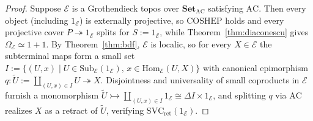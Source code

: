 \documentclass[10pt,twoside,openright]{book}
\theoremstyle{crmplain}
\theoremstyle{crmdef}
\theoremstyle{crmremark}
\begin{document}
\begin{proof}
Suppose $\mathcal{E}$ is a Grothendieck topos over $\mathbf{Set}_{\mathrm{AC}}$ satisfying $\mathrm{AC}$. Then every object (including $1_{\mathcal{E}}$) is externally projective, so $\mathrm{COSHEP}$ holds and every projective cover $P \twoheadrightarrow 1_{\mathcal{E}}$ splits for $S := 1_{\mathcal{E}}$, while Theorem~\ref{thm:diaconescu} gives $\Omega_{\mathcal{E}} \simeq 1+1$. By Theorem~\ref{thm:bdf}, $\mathcal{E}$ is localic, so for every $X \in \mathcal{E}$ the subterminal maps form a small set $I := \{(U, x) \mid U \in \mathrm{Sub}_{\mathcal{E}}(1_{\mathcal{E}}),\, x \in \mathrm{Hom}_{\mathcal{E}}(U, X)\}$ with canonical epimorphism $q : \widetilde{U} := \coprod_{(U, x) \in I} U \twoheadrightarrow X$. Disjointness and universality of small coproducts in $\mathcal{E}$ furnish a monomorphism $\widetilde{U} \rightarrowtail \coprod_{(U, x) \in I} 1_{\mathcal{E}} \cong \Delta I \times 1_{\mathcal{E}}$, and splitting $q$ via $\mathrm{AC}$ realizes $X$ as a retract of $\widetilde{U}$, verifying $\mathrm{SVC}_{\mathrm{ret}}(1_{\mathcal{E}})$.


\end{proof}
\end{document}
